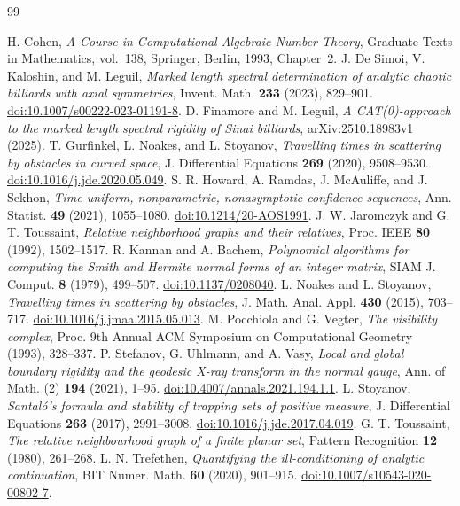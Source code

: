 \begin{thebibliography}{99}
\raggedright
{}
H. Cohen, \emph{A Course in Computational Algebraic Number Theory},
Graduate Texts in Mathematics, vol.~138, Springer, Berlin, 1993, Chapter~2.
J. De Simoi, V. Kaloshin, and M. Leguil,
\emph{Marked length spectral determination of analytic chaotic billiards
with axial symmetries}, Invent. Math. \textbf{233} (2023), 829--901.
\href{https://doi.org/10.1007/s00222-023-01191-8}{doi:10.1007/s00222-023-01191-8}.
D. Finamore and M. Leguil,
\emph{A CAT(0)-approach to the marked length spectral rigidity of Sinai
billiards}, arXiv:2510.18983v1 (2025).
T. Gurfinkel, L. Noakes, and L. Stoyanov,
\emph{Travelling times in scattering by obstacles in curved space},
J. Differential Equations \textbf{269} (2020), 9508--9530.
\href{https://doi.org/10.1016/j.jde.2020.05.049}{doi:10.1016/j.jde.2020.05.049}.
S. R. Howard, A. Ramdas, J. McAuliffe, and J. Sekhon,
\emph{Time-uniform, nonparametric, nonasymptotic confidence sequences},
Ann. Statist. \textbf{49} (2021), 1055--1080.
\href{https://doi.org/10.1214/20-AOS1991}{doi:10.1214/20-AOS1991}.
J. W. Jaromczyk and G. T. Toussaint,
\emph{Relative neighborhood graphs and their relatives},
Proc. IEEE \textbf{80} (1992), 1502--1517.
R. Kannan and A. Bachem,
\emph{Polynomial algorithms for computing the Smith and Hermite normal
forms of an integer matrix}, SIAM J. Comput. \textbf{8} (1979), 499--507.
\href{https://doi.org/10.1137/0208040}{doi:10.1137/0208040}.
L. Noakes and L. Stoyanov,
\emph{Travelling times in scattering by obstacles},
J. Math. Anal. Appl. \textbf{430} (2015), 703--717.
\href{https://doi.org/10.1016/j.jmaa.2015.05.013}{doi:10.1016/j.jmaa.2015.05.013}.
M. Pocchiola and G. Vegter, \emph{The visibility complex},
Proc. 9th Annual ACM Symposium on Computational Geometry (1993), 328--337.
P. Stefanov, G. Uhlmann, and A. Vasy,
\emph{Local and global boundary rigidity and the geodesic X-ray transform
in the normal gauge}, Ann. of Math. (2) \textbf{194} (2021), 1--95.
\href{https://doi.org/10.4007/annals.2021.194.1.1}{doi:10.4007/annals.2021.194.1.1}.
L. Stoyanov,
\emph{Santal\'o's formula and stability of trapping sets of positive measure},
J. Differential Equations \textbf{263} (2017), 2991--3008.
\href{https://doi.org/10.1016/j.jde.2017.04.019}{doi:10.1016/j.jde.2017.04.019}.
G. T. Toussaint, \emph{The relative neighbourhood graph of a finite planar
set}, Pattern Recognition \textbf{12} (1980), 261--268.
L. N. Trefethen,
\emph{Quantifying the ill-conditioning of analytic continuation},
BIT Numer. Math. \textbf{60} (2020), 901--915.
\href{https://doi.org/10.1007/s10543-020-00802-7}{doi:10.1007/s10543-020-00802-7}.
\end{thebibliography}
